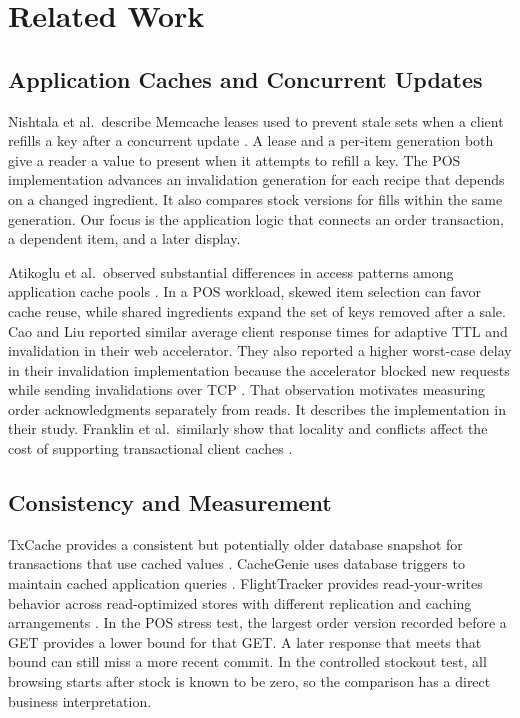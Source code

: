 \section{Related Work}

\subsection{Application Caches and Concurrent Updates}

Nishtala et al.\ describe Memcache leases used to prevent stale sets when a client refills a key after a concurrent update \cite{nishtala2013}. A lease and a per-item generation both give a reader a value to present when it attempts to refill a key. The POS implementation advances an invalidation generation for each recipe that depends on a changed ingredient. It also compares stock versions for fills within the same generation. Our focus is the application logic that connects an order transaction, a dependent item, and a later display.

Atikoglu et al.\ observed substantial differences in access patterns among application cache pools \cite{atikoglu2012}. In a POS workload, skewed item selection can favor cache reuse, while shared ingredients expand the set of keys removed after a sale. Cao and Liu reported similar average client response times for adaptive TTL and invalidation in their web accelerator. They also reported a higher worst-case delay in their invalidation implementation because the accelerator blocked new requests while sending invalidations over TCP \cite{cao1998}. That observation motivates measuring order acknowledgments separately from reads. It describes the implementation in their study. Franklin et al.\ similarly show that locality and conflicts affect the cost of supporting transactional client caches \cite{franklin1997}.

\subsection{Consistency and Measurement}

TxCache provides a consistent but potentially older database snapshot for transactions that use cached values \cite{ports2010}. CacheGenie uses database triggers to maintain cached application queries \cite{gupta2011}. FlightTracker provides read-your-writes behavior across read-optimized stores with different replication and caching arrangements \cite{shi2020}. In the POS stress test, the largest order version recorded before a GET provides a lower bound for that GET. A later response that meets that bound can still miss a more recent commit. In the controlled stockout test, all browsing starts after stock is known to be zero, so the comparison has a direct business interpretation.


